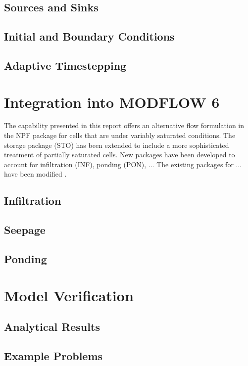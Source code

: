 \documentclass[fleqn]{article}
\begin{document}
\subsection{Sources and Sinks}
\subsection{Initial and Boundary Conditions}
\subsection{Adaptive Timestepping}

\section{Integration into MODFLOW 6}
The capability presented in this report offers an alternative flow
formulation in the NPF package for cells that are under variably 
saturated conditions. The storage package (STO) has been extended
to include a more sophisticated treatment of partially saturated
cells. New packages have been developed to account for infiltration (INF),
ponding (PON), ... The existing packages for ... have been modified .

\subsection{Infiltration}
\subsection{Seepage}
\subsection{Ponding}

\section{Model Verification}
\subsection{Analytical Results}
\subsection{Example Problems}


 
\end{document}
